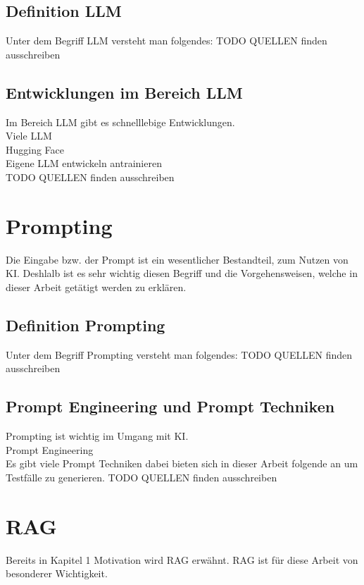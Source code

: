 \documentclass[12pt,toc=bib,toc=listof]{scrreprt}
\begin{document}
\subsection{Definition LLM} %
\label{sec:definitionLLM}
Unter dem Begriff LLM versteht man folgendes:
TODO QUELLEN finden ausschreiben

\subsection{Entwicklungen im Bereich LLM} %
\label{sec:entwicklungenImBereichLLM}
Im Bereich LLM gibt es schnelllebige Entwicklungen.\\
Viele LLM\\
Hugging Face\\
Eigene LLM entwickeln antrainieren\\
TODO QUELLEN finden ausschreiben

\section{Prompting} %
\label{sec:prompting}
Die Eingabe bzw. der Prompt ist ein wesentlicher Bestandteil, zum Nutzen von KI. Deshlalb ist es sehr wichtig diesen Begriff und die Vorgehensweisen, welche in dieser Arbeit getätigt werden zu erklären.

\subsection{Definition Prompting} %
\label{sec:definitionPrompting}
Unter dem Begriff Prompting versteht man folgendes:
TODO QUELLEN finden ausschreiben

\subsection{Prompt Engineering und Prompt Techniken} %
\label{sec:promptEngineeringUndPromptTechniken}
Prompting ist wichtig im Umgang mit KI.\\
Prompt Engineering\\
Es gibt viele Prompt Techniken dabei bieten sich in dieser Arbeit folgende an um Testfälle zu generieren.
TODO QUELLEN finden ausschreiben

\section{RAG} %
\label{sec:rag}
Bereits in Kapitel 1 Motivation wird RAG erwähnt. RAG ist für diese Arbeit von besonderer Wichtigkeit. 
\end{document}
